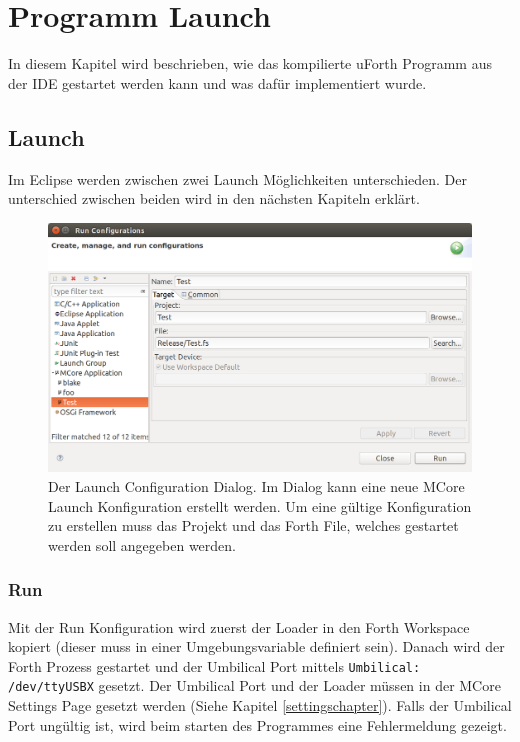 \chapter{Programm Launch}
\label{chap:programlaunch}
In diesem Kapitel wird beschrieben, wie das kompilierte uForth Programm aus der IDE gestartet werden kann und was dafür implementiert wurde.

\section{Launch}

Im Eclipse werden zwischen zwei Launch Möglichkeiten unterschieden. Der unterschied zwischen beiden wird in den nächsten Kapiteln erklärt.

\begin{figure}[H]
	\centering
		\includegraphics[scale=0.3]{launch/run.png}
		\caption{Der Launch Configuration Dialog. Im Dialog kann eine neue MCore Launch Konfiguration erstellt werden. Um eine gültige Konfiguration zu erstellen muss das Projekt und das Forth File, welches gestartet werden soll angegeben werden.}
		\label{fig:run}
\end{figure}

\newpage
\subsection{Run}

Mit der Run Konfiguration wird zuerst der Loader in den Forth Workspace kopiert (dieser muss in einer Umgebungsvariable definiert sein). Danach wird der Forth Prozess gestartet und der Umbilical Port mittels \verb!Umbilical: /dev/ttyUSBX! gesetzt. Der Umbilical Port und der Loader müssen in der MCore Settings Page gesetzt werden (Siehe Kapitel \ref{settingschapter}). Falls der Umbilical Port ungültig ist, wird beim starten des Programmes eine Fehlermeldung gezeigt.

